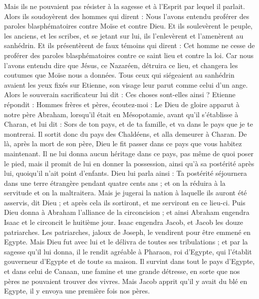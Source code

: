 \begin{multicols}{2}
Mais ils ne pouvaient pas résister à la sagesse et à l'Esprit par lequel il parlait.
Alors ils soudoyèrent des hommes qui dirent : Nous l’avons entendu proférer des paroles blasphématoires contre Moïse et contre Dieu.
Et ils soulevèrent le peuple, les anciens, et les scribes, et se jetant sur lui, ils l'enlevèrent et l'amenèrent au sanhédrin.
Et ils présentèrent de faux témoins qui dirent : Cet homme ne cesse de proférer des paroles blasphématoires contre ce saint lieu et contre la loi.
Car nous l’avons entendu dire que Jésus, ce Nazaréen, détruira ce lieu, et changera les coutumes que Moïse nous a données.
Tous ceux qui siégeaient au sanhédrin avaient les yeux fixés sur Etienne, son visage leur parut comme celui d'un ange.
\VerseOne{}Alors le souverain sacrificateur lui dit : Ces choses sont-elles ainsi ?
Etienne répondit : Hommes frères et pères, écoutez-moi : Le Dieu de gloire apparut à notre père Abraham, lorsqu’il était en Mésopotamie, avant qu'il s’établisse à Charan, et lui dit :
Sors de ton pays, et de ta famille, et va dans le pays que je te montrerai.
Il sortit donc du pays des Chaldéens, et alla demeurer à Charan. De là, après la mort de son père, Dieu le fit passer dans ce pays que vous habitez maintenant.
Il ne lui donna aucun héritage dans ce pays, pas même de quoi poser le pied, mais il promit de lui en donner la possession, ainsi qu’à sa postérité après lui, quoiqu’il n’ait point d’enfants.
Dieu lui parla ainsi : Ta postérité séjournera dans une terre étrangère pendant quatre cents ans ; et on la réduira à la servitude et on la maltraitera.
Mais je jugerai la nation à laquelle ils auront été asservis, dit Dieu ; et après cela ils sortiront, et me serviront en ce lieu-ci.
Puis Dieu donna à Abraham l'alliance de la circoncision ; et ainsi Abraham engendra Isaac et le circoncit le huitième jour. Isaac engendra Jacob, et Jacob les douze patriarches.
Les patriarches, jaloux de Joseph, le vendirent pour être emmené en Egypte.
Mais Dieu fut avec lui et le délivra de toutes ses tribulations ; et par la sagesse qu’il lui donna, il le rendit agréable à Pharaon, roi d'Egypte, qui l'établit gouverneur d’Egypte et de toute sa maison.
Il survint dans tout le pays d'Egypte, et dans celui de Canaan, une famine et une grande détresse, en sorte que nos pères ne pouvaient trouver des vivres.
Mais Jacob apprit qu'il y avait du blé en Egypte, il y envoya une première fois nos pères.

\end{multicols}
